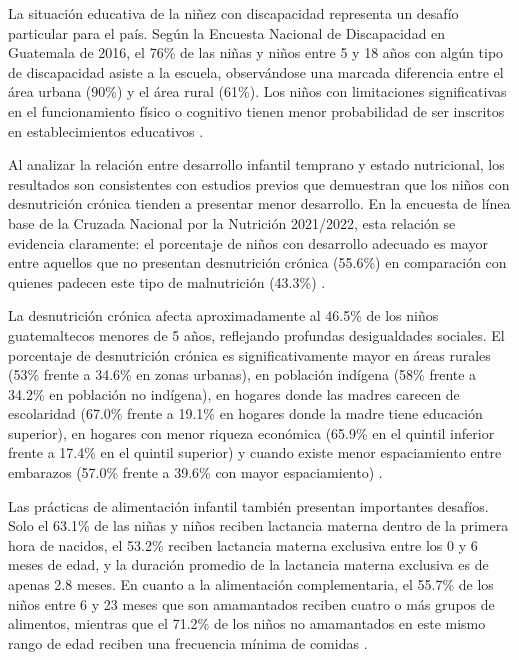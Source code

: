 \documentclass[11pt,letterpaper]{report}
\begin{document}
La situación educativa de la niñez con discapacidad representa un desafío
particular para el país. Según la Encuesta Nacional de Discapacidad en Guatemala
de 2016, el 76\% de las niñas y niños entre 5 y 18 años con algún tipo de
discapacidad asiste a la escuela, observándose una marcada diferencia entre el
área urbana (90\%) y el área rural (61\%). Los niños con limitaciones
significativas en el funcionamiento físico o cognitivo tienen menor probabilidad de ser inscritos en establecimientos educativos \cite{PoliticaInfanciaGuate}.

Al analizar la relación entre desarrollo infantil temprano y estado nutricional, 
los resultados son consistentes con estudios previos que demuestran que los 
niños con desnutrición crónica tienden a presentar menor desarrollo. En la 
encuesta de línea base de la Cruzada Nacional por la Nutrición 2021/2022, esta 
relación se evidencia claramente: el porcentaje de niños con desarrollo 
adecuado es mayor entre aquellos que no presentan desnutrición crónica (55.6\%) 
en comparación con quienes padecen este tipo de malnutrición (43.3\%) 
\cite{SESAN2022}.

La desnutrición crónica afecta aproximadamente al 46.5\% de los niños
guatemaltecos menores de 5 años, reflejando profundas desigualdades sociales.
El porcentaje de desnutrición crónica es significativamente mayor en áreas
rurales (53\% frente a 34.6\% en zonas urbanas), en población indígena (58\%
frente a 34.2\% en población no indígena), en hogares donde las madres carecen
de escolaridad (67.0\% frente a 19.1\% en hogares donde la madre tiene
educación superior), en hogares con menor riqueza económica (65.9\% en el
quintil inferior frente a 17.4\% en el quintil superior) y cuando existe menor
espaciamiento entre embarazos (57.0\% frente a 39.6\% con mayor espaciamiento)
\cite{EnMaternoInfantil}.

Las prácticas de alimentación infantil también presentan importantes desafíos.
Solo el 63.1\% de las niñas y niños reciben lactancia materna dentro de la
primera hora de nacidos, el 53.2\% reciben lactancia materna exclusiva entre
los 0 y 6 meses de edad, y la duración promedio de la lactancia materna
exclusiva es de apenas 2.8 meses. En cuanto a la alimentación complementaria,
el 55.7\% de los niños entre 6 y 23 meses que son amamantados reciben cuatro o
más grupos de alimentos, mientras que el 71.2\% de los niños no amamantados en
este mismo rango de edad reciben una frecuencia mínima de comidas
\cite{EnMaternoInfantil, PoliticaInfanciaGuate}.
\end{document}
